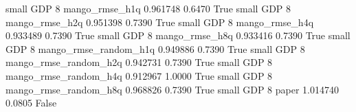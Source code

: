      small      GDP                 8        mango_rmse_h1q   0.961748      0.6470    True
     small      GDP                 8        mango_rmse_h2q   0.951398      0.7390    True
     small      GDP                 8        mango_rmse_h4q   0.933489      0.7390    True
     small      GDP                 8        mango_rmse_h8q   0.933416      0.7390    True
     small      GDP                 8 mango_rmse_random_h1q   0.949886      0.7390    True
     small      GDP                 8 mango_rmse_random_h2q   0.942731      0.7390    True
     small      GDP                 8 mango_rmse_random_h4q   0.912967      1.0000    True
     small      GDP                 8 mango_rmse_random_h8q   0.968826      0.7390    True
     small      GDP                 8                 paper   1.014740      0.0805   False